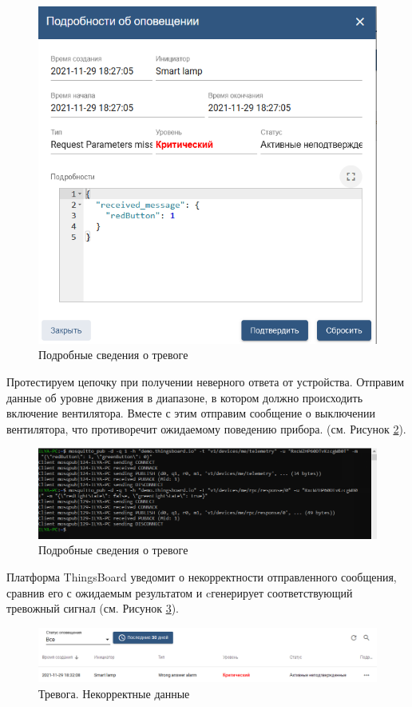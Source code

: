 \documentclass[a4paper,14pt]{extarticle}
\begin{document}
\begin{figure}[h!]
	\centering
	\includegraphics[width=0.7\linewidth]{images/t2-alarm-missing-params-detail}
	\caption{Подробные сведения о тревоге}
	\label{fig:t2-alarm-missing-params-detail}
\end{figure}

Протестируем цепочку при получении неверного ответа от устройства. Отправим данные об уровне движения в диапазоне, в котором должно происходить включение вентилятора. Вместе с этим отправим сообщение о выключении вентилятора, что противоречит ожидаемому поведению прибора. (см. Рисунок \ref{fig:t2-send-p2}).

\begin{figure}[h!]
	\centering
	\includegraphics[width=1\linewidth]{images/t2-send-p2}
	\caption{Подробные сведения о тревоге}
	\label{fig:t2-send-p2}
\end{figure}

Платформа ThingsBoard уведомит о некорректности отправленного сообщения, сравнив его с ожидаемым результатом и cгенерирует соответствующий тревожный сигнал (см. Рисунок \ref{fig:t2-alarm-wrong-response}).

\begin{figure}[h!]
	\centering
	\includegraphics[width=1\linewidth]{images/t2-alarm-wrong-response}
	\caption{Тревога. Некорректные данные}
	\label{fig:t2-alarm-wrong-response}
\end{figure}
\end{document}
